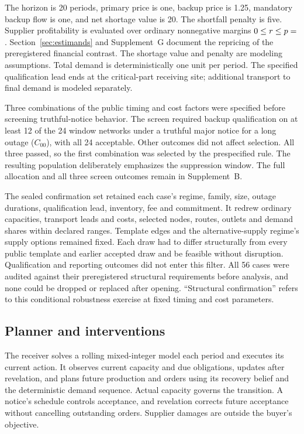 \documentclass[preprint,11pt,authoryear]{elsarticle}
\begin{document}
The horizon is 20 periods, primary price is one, backup price is 1.25, mandatory backup flow is one, and net shortage value is 20. The shortfall penalty is five. Supplier profitability is evaluated over ordinary nonnegative margins $0\le r\le p=\pc{rMax}$. Section~\ref{sec:estimands} and Supplement~G document the repricing of the preregistered financial contrast. The shortage value and penalty are modeling assumptions. Total demand is deterministically one unit per period. The specified qualification lead ends at the critical-part receiving site; additional transport to final demand is modeled separately.

Three combinations of the public timing and cost factors were specified before screening truthful-notice behavior. The screen required backup qualification on at least 12 of the 24 window networks under a truthful major notice for a long outage ($C_{00}$), with all 24 acceptable. Other outcomes did not affect selection. All three passed, so the first combination was selected by the prespecified rule. The resulting population deliberately emphasizes the suppression window. The full allocation and all three screen outcomes remain in Supplement~B.

The sealed confirmation set retained each case's regime, family, size, outage durations, qualification lead, inventory, fee and commitment. It redrew ordinary capacities, transport leads and costs, selected nodes, routes, outlets and demand shares within declared ranges. Template edges and the alternative-supply regime's supply options remained fixed. Each draw had to differ structurally from every public template and earlier accepted draw and be feasible without disruption. Qualification and reporting outcomes did not enter this filter. All 56 cases were audited against their preregistered structural requirements before analysis, and none could be dropped or replaced after opening. ``Structural confirmation'' refers to this conditional robustness exercise at fixed timing and cost parameters.

\subsection{Planner and interventions}
The receiver solves a rolling mixed-integer model each period and executes its current action. It observes current capacity and due obligations, updates after revelation, and plans future production and orders using its recovery belief and the deterministic demand sequence. Actual capacity governs the transition. A notice's schedule controls acceptance, and revelation corrects future acceptance without cancelling outstanding orders. Supplier damages are outside the buyer's objective.
\end{document}
